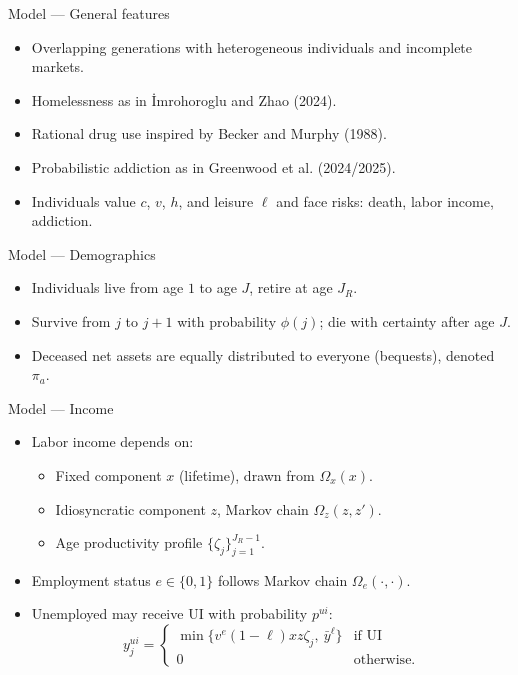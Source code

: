 \documentclass[10pt,aspectratio=169]{beamer}
\newcommand{\drug}{v}          %
\newcommand{\nondrug}{c}       %
\newcommand{\house}{h}         %
\newcommand{\leis}{\ell}       %
\begin{document}
\begin{frame}{Model --- General features}
\begin{itemize}
\item Overlapping generations with heterogeneous individuals and incomplete markets.
\item Homelessness as in \.{I}mrohoroglu and Zhao (2024).
\item Rational drug use inspired by Becker and Murphy (1988).
\item Probabilistic addiction as in Greenwood et al. (2024/2025).
\item Individuals value $\nondrug$, $\drug$, $\house$, and leisure $\leis$ and face risks: death, labor income, addiction.
\end{itemize}
\end{frame}

\begin{frame}{Model --- Demographics}
\begin{itemize}
\item Individuals live from age $1$ to age $J$, retire at age $J_R$.
\item Survive from $j$ to $j+1$ with probability $\phi(j)$; die with certainty after age $J$.
\item Deceased net assets are equally distributed to everyone (bequests), denoted $\pi_a$.
\end{itemize}
\end{frame}

\begin{frame}{Model --- Income}
\begin{itemize}
\item Labor income depends on:
\begin{itemize}
\item Fixed component $x$ (lifetime), drawn from $\Omega_x(x)$.
\item Idiosyncratic component $z$, Markov chain $\Omega_z(z,z')$.
\item Age productivity profile $\{\zeta_j\}_{j=1}^{J_R-1}$.
\end{itemize}
\item Employment status $e\in\{0,1\}$ follows Markov chain $\Omega_e(\cdot,\cdot)$.
\item Unemployed may receive UI with probability $p^{ui}$:
\[
y^{ui}_j =
\begin{cases}
\min\{ v^e(1-\leis) x z \zeta_j,\ \bar y^{\leis}\} & \text{if UI}\\
0 & \text{otherwise.}
\end{cases}
\]
\end{itemize}
\end{frame}
\end{document}
